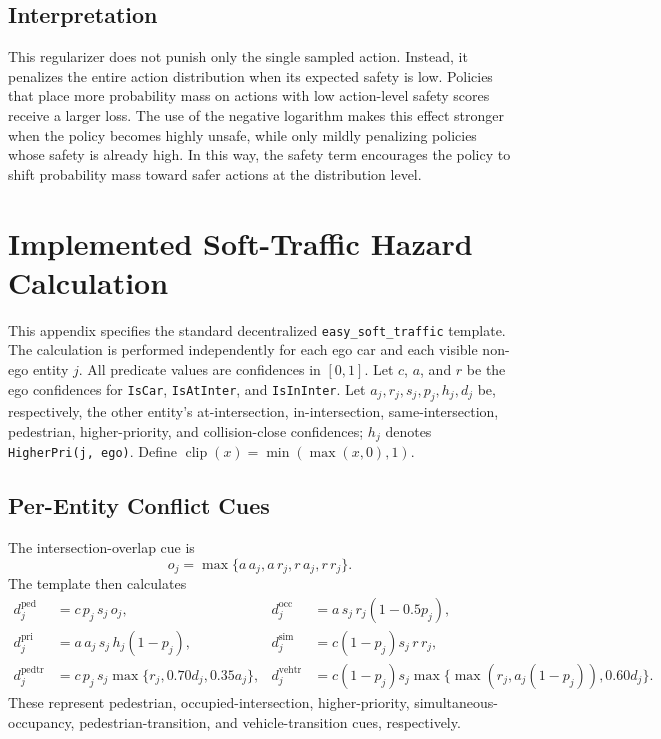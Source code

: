 \subsection{Interpretation}

This regularizer does not punish only the single sampled action. Instead, it penalizes the entire action distribution when its expected safety is low. Policies that place more probability mass on actions with low action-level safety scores receive a larger loss. The use of the negative logarithm makes this effect stronger when the policy becomes highly unsafe, while only mildly penalizing policies whose safety is already high. In this way, the safety term encourages the policy to shift probability mass toward safer actions at the distribution level.

\section{Implemented Soft-Traffic Hazard Calculation}
\label{app:soft-traffic-hazard-calculation}

This appendix specifies the standard decentralized \texttt{easy\_soft\_traffic} template. The calculation is performed independently for each ego car and each visible non-ego entity \(j\). All predicate values are confidences in \([0,1]\). Let \(c\), \(a\), and \(r\) be the ego confidences for \texttt{IsCar}, \texttt{IsAtInter}, and \texttt{IsInInter}. Let \(a_j,r_j,s_j,p_j,h_j,d_j\) be, respectively, the other entity's at-intersection, in-intersection, same-intersection, pedestrian, higher-priority, and collision-close confidences; \(h_j\) denotes \texttt{HigherPri(j, ego)}. Define \(\operatorname{clip}(x)=\min(\max(x,0),1)\).

\subsection{Per-Entity Conflict Cues}

The intersection-overlap cue is
\[
o_j=\max\{a\,a_j,a\,r_j,r\,a_j,r\,r_j\}.
\]
The template then calculates
\[
\begin{aligned}
d^{\mathrm{ped}}_j &= c\,p_j\,s_j\,o_j, &
d^{\mathrm{occ}}_j &= a\,s_j\,r_j(1-0.5p_j),\\
d^{\mathrm{pri}}_j &= a\,a_j\,s_j\,h_j(1-p_j), &
d^{\mathrm{sim}}_j &= c(1-p_j)s_j\,r\,r_j,\\
d^{\mathrm{pedtr}}_j &= c\,p_j\,s_j\max\{r_j,0.70d_j,0.35a_j\}, &
d^{\mathrm{vehtr}}_j &= c(1-p_j)s_j\max\{\max(r_j,a_j(1-p_j)),0.60d_j\}.
\end{aligned}
\]
These represent pedestrian, occupied-intersection, higher-priority, simultaneous-occupancy, pedestrian-transition, and vehicle-transition cues, respectively.

